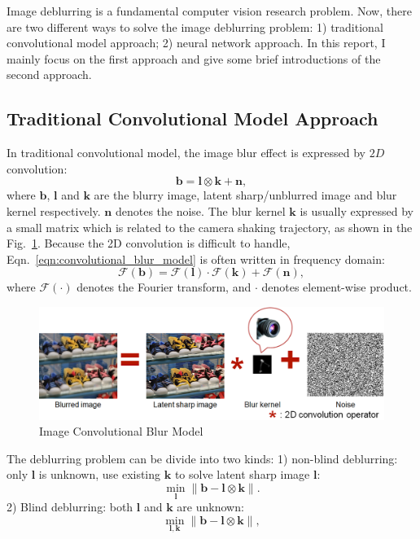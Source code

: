 \documentclass[journal, onecolumn, 10pt]{IEEEtran}
\begin{document}
Image deblurring is a fundamental computer vision research problem. Now, there are two different ways to solve the image deblurring problem: 1) traditional convolutional model approach; 2) neural network approach. In this report, I mainly focus on the first approach and give some brief introductions of the second approach.

\subsection{Traditional Convolutional Model Approach}
In traditional convolutional model, the image blur effect is expressed by $2D$ convolution:
\begin{equation}
\mathbf{b} = \mathbf{l} \otimes \mathbf{k} + \mathbf{n},
\label{eqn:convolutional_blur_model}
\end{equation}
where $\mathbf{b}$, $\mathbf{l}$ and $\mathbf{k}$ are the blurry image, latent sharp/unblurred image and blur kernel respectively. $\mathbf{n}$ denotes the noise. The blur kernel $\mathbf{k}$ is usually expressed by a small matrix which is related to the camera shaking trajectory, as shown in the Fig.~\ref{fig:convolutional_blur_model}. Because the 2D convolution is difficult to handle, Eqn.~\ref{eqn:convolutional_blur_model} is often written in frequency domain:
\begin{equation}
\mathcal{F}(\mathbf{b}) = \mathcal{F}(\mathbf{l}) \cdot \mathcal{F}(\mathbf{k}) + \mathcal{F}(\mathbf{n}),
\label{eqn:convolutional_blur_model_frequency}
\end{equation}
where $\mathcal{F}(\cdot)$ denotes the Fourier transform, and $\cdot$ denotes element-wise product.
\begin{figure}[h!]
\centering
\includegraphics[width = 1\textwidth]{pic/convolutional_model.png}
\caption{Image Convolutional Blur Model}
\label{fig:convolutional_blur_model}
\end{figure}

The deblurring problem can be divide into two kinds: 1) non-blind deblurring: only $\mathbf{l}$ is unknown, use existing $\mathbf{k}$ to solve latent sharp image $\mathbf{l}$:
\begin{equation}
\min_{\mathbf{l}} \| \mathbf{b} - \mathbf{l} \otimes \mathbf{k} \|.
\label{eqn:non_blind_origin}
\end{equation}
2) Blind deblurring: both $\mathbf{l}$ and $\mathbf{k}$ are unknown:
\begin{equation}
\min_{\mathbf{l}, \mathbf{k}} \| \mathbf{b} - \mathbf{l} \otimes \mathbf{k} \|,
\label{eqn:blind_origin}
\end{equation}
\end{document}
